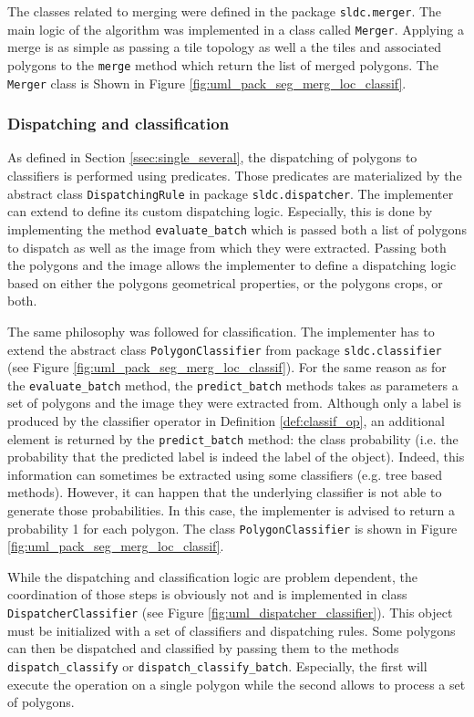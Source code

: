 The classes related to merging were defined in the package \texttt{sldc.merger}. The main logic of the algorithm was implemented in a class called \texttt{Merger}. Applying a merge is as simple as passing a tile topology as well a the tiles and associated polygons to the \texttt{merge} method which return the list of merged polygons. The \texttt{Merger} class is Shown in Figure \ref{fig:uml_pack_seg_merg_loc_classif}.

\subsubsection{Dispatching and classification}
\label{sssec:dispatch}
As defined in Section \ref{ssec:single_several}, the dispatching of polygons to classifiers is performed using predicates. Those predicates are materialized by the abstract class \texttt{DispatchingRule} in package \texttt{sldc.dispatcher}. The implementer can extend to define its custom dispatching logic. Especially, this is done by implementing the method \texttt{evaluate\_batch} which is passed both a list of polygons to dispatch as well as the image from which they were extracted. Passing both the polygons and the image allows the implementer to define a dispatching logic based on either the polygons geometrical properties, or the polygons crops, or both.  

The same philosophy was followed for classification. The implementer has to extend the abstract class \texttt{PolygonClassifier} from package \texttt{sldc.classifier} (see Figure \ref{fig:uml_pack_seg_merg_loc_classif}). For the same reason as for the \texttt{evaluate\_batch} method, the \texttt{predict\_batch} methods takes as parameters a set of polygons and the image they were extracted from. Although only a label is produced by the classifier operator in Definition \ref{def:classif_op}, an additional element is returned by the \texttt{predict\_batch} method: the class probability (i.e. the probability that the predicted label is indeed the label of the object). Indeed, this information can sometimes be extracted using some classifiers (e.g. tree based methods). However, it can happen that the underlying classifier is not able to generate those probabilities. In this case, the implementer is advised to return a probability 1 for each polygon. The class \texttt{PolygonClassifier} is shown in Figure \ref{fig:uml_pack_seg_merg_loc_classif}.

While the dispatching and classification logic are problem dependent, the coordination of those steps is obviously not and is implemented in class \texttt{DispatcherClassifier} (see Figure \ref{fig:uml_dispatcher_classifier}). This object must be initialized with a set of classifiers and dispatching rules. Some polygons can then be dispatched and classified by passing them to the methods \texttt{dispatch\_classify} or \texttt{dispatch\_classify\_batch}. Especially, the first will execute the operation on a single polygon while the second allows to process a set of polygons. 

